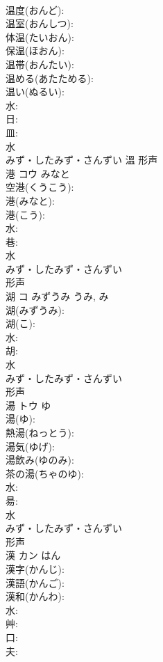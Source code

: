 \documentclass[8pt]{extreport}
\begin{document}
\begin{CJK}{UTF8}{min}
\\	温度(おんど): 
\\	温室(おんしつ): 
\\	体温(たいおん): 
\\	保温(ほおん): 
\\	温帯(おんたい): 
\\	温める(あたためる): 
\\	温い(ぬるい): 
\\	水: 
\\	日: 
\\	皿: 
\\	水	
\\	みず・したみず・さんずい	溫	形声 
\\	港	コウ	みなと		
\\	空港(くうこう): 
\\	港(みなと): 
\\	港(こう): 
\\	水: 
\\	巷: 
\\	水	
\\	みず・したみず・さんずい	
\\	形声 
\\	湖	コ	みずうみ	うみ, み	
\\	湖(みずうみ): 
\\	湖(こ): 
\\	水: 
\\	胡: 
\\	水	
\\	みず・したみず・さんずい	
\\	形声 
\\	湯	トウ	ゆ		
\\	湯(ゆ): 
\\	熱湯(ねっとう): 
\\	湯気(ゆげ): 
\\	湯飲み(ゆのみ): 
\\	茶の湯(ちゃのゆ): 
\\	水: 
\\	昜: 
\\	水	
\\	みず・したみず・さんずい	
\\	形声 
\\	漢	カン		はん	
\\	漢字(かんじ): 
\\	漢語(かんご): 
\\	漢和(かんわ): 
\\	水: 
\\	艸: 
\\	口: 
\\	夫: 

\end{CJK}
\end{document}
